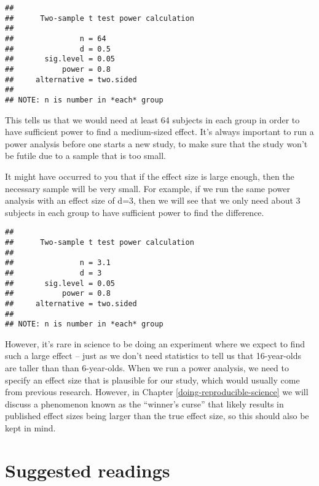 \documentclass[]{book}
\newenvironment{Shaded}{\begin{snugshade}}{\end{snugshade}}
\newcommand{\KeywordTok}[1]{\textcolor[rgb]{0.13,0.29,0.53}{\textbf{#1}}}
\newcommand{\DataTypeTok}[1]{\textcolor[rgb]{0.13,0.29,0.53}{#1}}
\newcommand{\FloatTok}[1]{\textcolor[rgb]{0.00,0.00,0.81}{#1}}
\newcommand{\CommentTok}[1]{\textcolor[rgb]{0.56,0.35,0.01}{\textit{#1}}}
\newcommand{\NormalTok}[1]{#1}
\theoremstyle{definition}
\theoremstyle{definition}
\theoremstyle{definition}
\theoremstyle{remark}
\begin{document}
\begin{Shaded}
\end{Shaded}

\begin{verbatim}
## 
##      Two-sample t test power calculation 
## 
##               n = 64
##               d = 0.5
##       sig.level = 0.05
##           power = 0.8
##     alternative = two.sided
## 
## NOTE: n is number in *each* group
\end{verbatim}

This tells us that we would need at least 64 subjects in each group in
order to have sufficient power to find a medium-sized effect. It's
always important to run a power analysis before one starts a new study,
to make sure that the study won't be futile due to a sample that is too
small.

It might have occurred to you that if the effect size is large enough,
then the necessary sample will be very small. For example, if we run the
same power analysis with an effect size of d=3, then we will see that we
only need about 3 subjects in each group to have sufficient power to
find the difference.

\begin{verbatim}
## 
##      Two-sample t test power calculation 
## 
##               n = 3.1
##               d = 3
##       sig.level = 0.05
##           power = 0.8
##     alternative = two.sided
## 
## NOTE: n is number in *each* group
\end{verbatim}

However, it's rare in science to be doing an experiment where we expect
to find such a large effect -- just as we don't need statistics to tell
us that 16-year-olds are taller than than 6-year-olds. When we run a
power analysis, we need to specify an effect size that is plausible for
our study, which would usually come from previous research. However, in
Chapter \ref{doing-reproducible-science} we will discuss a phenomenon
known as the ``winner's curse'' that likely results in published effect
sizes being larger than the true effect size, so this should also be
kept in mind.

\section{Suggested readings}\label{suggested-readings-7}
\end{document}
